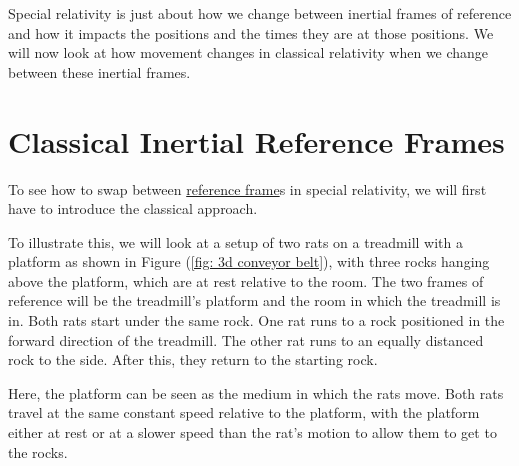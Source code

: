 Special relativity is just about how we change between inertial frames of reference and how it impacts the positions and the times they are at those positions.
We will now look at how movement changes in classical relativity when we change between these inertial frames.


\section{Classical Inertial Reference Frames} \label{sect: Classical Inertial Reference Frames}

To see how to swap between \hyperlink{def-Reference-frame}{reference frame}s in special relativity, we will first have to introduce the classical approach.

To illustrate this, we will look at a setup of two rats on a treadmill with a platform as shown in Figure (\ref{fig: 3d conveyor belt}), with three rocks hanging above the platform, which are at rest relative to the room.
The two frames of reference will be the treadmill's platform and the room in which the treadmill is in.
Both rats start under the same rock.
One rat runs to a rock positioned in the forward direction of the treadmill.
The other rat runs to an equally distanced rock to the side.
After this, they return to the starting rock.

Here, the platform can be seen as the medium in which the rats move.
Both rats travel at the same constant speed relative to the platform, with the platform either at rest or at a slower speed than the rat's motion to allow them to get to the rocks.

